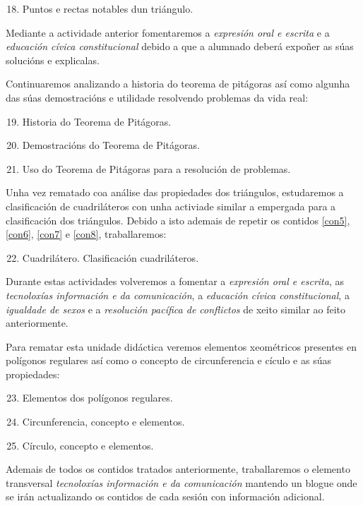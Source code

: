 \begin{enumerate}[label=\bfseries Con\arabic*, align=left, leftmargin=1.5cm]
  \setcounter{enumi}{17}
  \item\label{con18} Puntos e rectas notables dun triángulo.
\end{enumerate}

Mediante a actividade anterior fomentaremos a \emph{expresión oral e escrita} e a \emph{educación cívica constitucional} debido a que a alumnado deberá expoñer as súas solucións e explicalas.

Continuaremos analizando a historia do teorema de pitágoras así como algunha das súas demostracións e utilidade resolvendo problemas da vida real:

\begin{enumerate}[label=\bfseries Con\arabic*, align=left, leftmargin=1.5cm]
  \setcounter{enumi}{18}
  \item\label{con19} Historia do Teorema de Pitágoras.
  \item\label{con20} Demostracións do Teorema de Pitágoras.
  \item\label{con21} Uso do Teorema de Pitágoras para a resolución de problemas.
\end{enumerate}

Unha vez rematado coa análise das propiedades dos triángulos, estudaremos a clasificación de cuadriláteros con unha activiade similar a empergada para a clasificación dos triángulos. Debido a isto ademais de repetir os contidos  \ref{con5}, \ref{con6}, \ref{con7} e \ref{con8}, traballaremos:

\begin{enumerate}[label=\bfseries Con\arabic*, align=left, leftmargin=1.5cm]
  \setcounter{enumi}{21}
  \item\label{con22} Cuadrilátero. Clasificación cuadriláteros.
\end{enumerate}

Durante estas actividades volveremos a fomentar a \emph{expresión oral e escrita}, as \emph{tecnoloxías información e da comunicación}, a \emph{educación cívica constitucional}, a \emph{igualdade de sexos} e a \emph{resolución pacífica de conflictos} de xeito similar ao feito anteriormente.

Para rematar esta unidade didáctica veremos elementos xeométricos presentes en polígonos regulares así como o concepto de circunferencia e cículo e as súas propiedades:

\begin{enumerate}[label=\bfseries Con\arabic*, align=left, leftmargin=1.5cm]
  \setcounter{enumi}{22}
  \item\label{con23} Elementos dos polígonos regulares.
  \item\label{con24} Circunferencia, concepto e elementos.
  \item\label{con25} Círculo, concepto e elementos.
\end{enumerate}

Ademais de todos os contidos tratados anteriormente, traballaremos o elemento transversal \emph{tecnoloxías información e da comunicación} mantendo un blogue onde se irán actualizando os contidos de cada sesión con información adicional.
